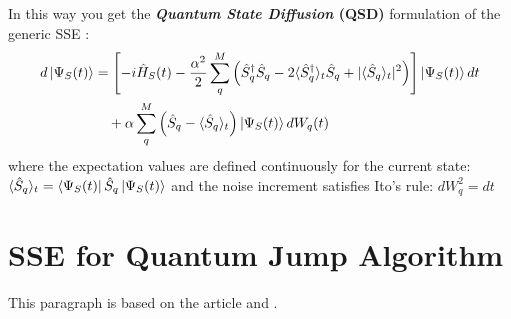\documentclass[a4paper,12pt]{article}
\begin{document}
	In this way you get the\textbf{ \textit{Quantum State Diffusion} (QSD)} formulation of the generic SSE : 	
	\begin{equation}
		\begin{aligned}
			d\ket{\Psi_{S}(t)} &= \left[ -i \hat{H}_{S}(t) 
			- \frac{\alpha^{2}}{2} \sum_{q}^{M} \left( \hat{S}^{\dagger}_{q} \hat{S}_{q} - 2\langle \hat{S}^{\dagger}_{q} \rangle_{t} \hat{S}_{q} + |\langle \hat{S}_{q} \rangle_{t}|^{2} \right) \right] \ket{\Psi_{S}(t)} dt \\
			&\quad + \alpha \sum_{q}^{M} \left( \hat{S}_{q} - \langle \hat{S}_{q} \rangle_{t} \right) \ket{\Psi_{S}(t)} dW_{q}(t)
		\end{aligned}
	\end{equation}
	where the expectation values are defined continuously for the current state: $ \langle \hat{S}_{q} \rangle_{t} = \bra{\Psi_{S}(t)} \hat{S}_{q} \ket{\Psi_{S}(t)} $ and the noise increment satisfies Ito's rule: $ dW_q^2 = dt $
	
	\section{SSE for Quantum Jump Algorithm}
	\label{sec:SSE_for_Quantum_Jump_Algorithm}
	This paragraph is based on the article \cite{cocciaProbingQuantumCoherence2018} and \cite{molmerMonteCarloWavefunction1993a}.
	
\end{document}
